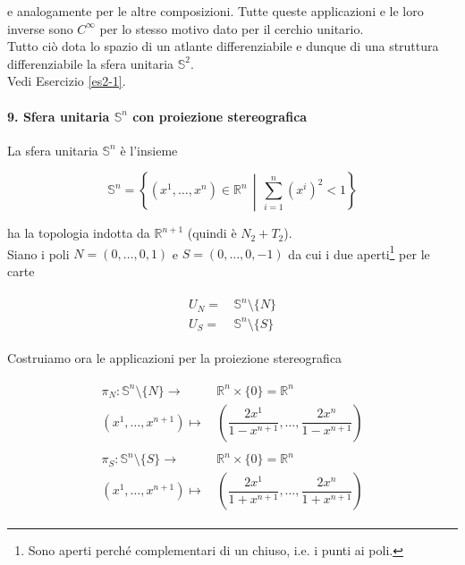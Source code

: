 e analogamente per le altre composizioni. Tutte queste applicazioni e le loro inverse sono $ C^{\infty} $ per lo stesso motivo dato per il cerchio unitario.\\
Tutto ciò dota lo spazio di un atlante differenziabile e dunque di una struttura differenziabile la sfera unitaria $ \mathbb{S}^{2} $.\\
Vedi Esercizio \ref{es2-1}.

\paragraph{9. Sfera unitaria $ \mathbb{S}^{n} $ con proiezione stereografica}

La sfera unitaria $ \mathbb{S}^{n} $ è l'insieme

\begin{equation}
	\mathbb{S}^{n} = \left\{ (x^{1},\dots,x^{n}) \in \mathbb{R}^{n} \, \middle| \, \sum_{i=1}^{n} (x^{i})^{2} < 1 \right\}
\end{equation}

ha la topologia indotta da $ \mathbb{R}^{n+1} $ (quindi è $ N_{2}+T_{2} $).\\
Siano i poli $ N = (0,\dots,0,1) $ e $ S = (0,\dots,0,-1) $ da cui i due aperti\footnote{%
	Sono aperti perché complementari di un chiuso, i.e. i punti ai poli.%
} per le carte

\begin{align}
	\begin{split}
		U_{N} =& \, \mathbb{S}^{n} \setminus \{N\}\\
		U_{S} =& \, \mathbb{S}^{n} \setminus \{S\}
	\end{split}
\end{align}

Costruiamo ora le applicazioni per la proiezione stereografica

\begin{align}
	\begin{split}
		\pi_{N} : \mathbb{S}^{n} \setminus \{N\} \to& \, \mathbb{R}^{n} \times \{0\} = \mathbb{R}^{n}\\
		(x^{1},\dots,x^{n+1}) \mapsto& \, \left( \dfrac{2x^{1}}{1-x^{n+1}},\dots,\dfrac{2x^{n}}{1-x^{n+1}} \right)\\\\
		\pi_{S} : \mathbb{S}^{n} \setminus \{S\} \to& \, \mathbb{R}^{n} \times \{0\} = \mathbb{R}^{n}\\
		(x^{1},\dots,x^{n+1}) \mapsto& \, \left( \dfrac{2x^{1}}{1+x^{n+1}},\dots,\dfrac{2x^{n}}{1+x^{n+1}} \right)
	\end{split}
\end{align}

